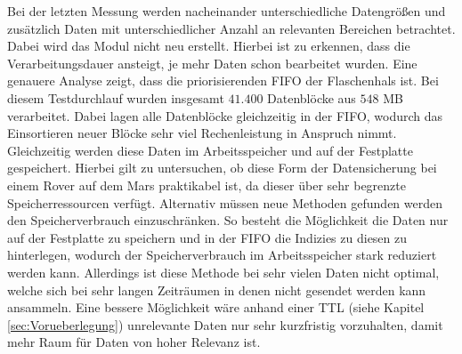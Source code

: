 Bei der letzten Messung werden nacheinander unterschiedliche
Datengrößen und zusätzlich Daten mit unterschiedlicher Anzahl an relevanten
Bereichen betrachtet. Dabei wird das Modul nicht neu erstellt. Hierbei ist zu
erkennen, dass die Verarbeitungsdauer ansteigt, je mehr Daten schon bearbeitet
wurden. Eine genauere Analyse zeigt, dass die priorisierenden \gls{FIFO} der
Flaschenhals ist. Bei diesem Testdurchlauf wurden insgesamt $41.400$ Datenblöcke
aus $548$ MB verarbeitet.
Dabei lagen alle Datenblöcke gleichzeitig in der \gls{FIFO}, wodurch das Einsortieren neuer
Blöcke sehr viel Rechenleistung in Anspruch nimmt. Gleichzeitig werden diese
Daten im Arbeitsspeicher und auf der Festplatte gespeichert. Hierbei gilt zu
untersuchen, ob diese Form der Datensicherung bei einem Rover auf dem
Mars praktikabel ist, da dieser über sehr begrenzte Speicherressourcen verfügt.
Alternativ müssen neue Methoden gefunden werden den Speicherverbrauch
einzuschränken. So besteht die Möglichkeit die Daten nur auf der Festplatte
zu speichern und in der \gls{FIFO} die Indizies zu diesen zu hinterlegen,
wodurch der Speicherverbrauch im Arbeitsspeicher stark reduziert werden kann.
Allerdings ist diese Methode bei sehr vielen Daten nicht optimal, welche sich
bei sehr langen Zeiträumen in denen nicht gesendet werden kann ansammeln.
Eine bessere Möglichkeit wäre anhand einer \gls{TTL} (siehe Kapitel
\ref{sec:Vorueberlegung}) unrelevante Daten nur sehr kurzfristig vorzuhalten, damit mehr Raum für Daten
von hoher Relevanz ist.
